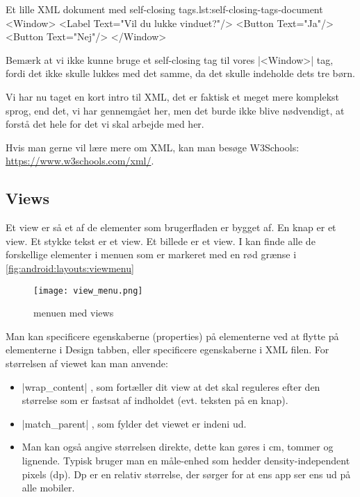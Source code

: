 \begin{example}
	\begin{XmlCode}{Et lille XML dokument med self-closing tags.}{lst:self-closing-tags-document}
		<Window>
			<Label Text="Vil du lukke vinduet?"/>
			<Button Text="Ja"/>
			<Button Text="Nej"/>
		</Window>
	\end{XmlCode}
\end{example}

\begin{remark}
	Bemærk at vi ikke kunne bruge et self-closing tag til vores \XmlInline|<Window>| tag, fordi det ikke skulle lukkes med det samme, da det skulle indeholde dets tre børn.
\end{remark}

Vi har nu taget en kort intro til XML, det er faktisk et meget mere komplekst sprog, end det, vi har gennemgået her, men det burde ikke blive nødvendigt, at forstå det hele for det vi skal arbejde med her.

Hvis man gerne vil lære mere om XML, kan man besøge W3Schools: \url{https://www.w3schools.com/xml/}.

\subsection{Views}
Et view er så et af de elementer som brugerfladen er bygget af. En knap er et view. Et stykke tekst er et view. Et billede er et view. I kan finde alle de forskellige elementer i menuen som er markeret med en rød grænse i \autoref{fig:android:layouts:viewmenu}

\begin{figure}[h]
		\texttt{[image: view\_menu.png]}
		\caption{menuen med views}
		\label{fig:android:layouts:viewmenu}
\end{figure}

Man kan specificere egenskaberne (properties) på elementerne ved at flytte på elementerne i Design tabben, eller specificere egenskaberne i XML filen. For størrelsen af viewet kan man anvende:
\begin{itemize}
	\item \XmlInline|wrap_content| , som fortæller dit view at det skal reguleres efter den størrelse som er fastsat af indholdet (evt. teksten på en knap).
	\item \XmlInline|match_parent| , som fylder det viewet er indeni ud.\\
	\item Man kan også angive størrelsen direkte, dette kan gøres i cm, tommer og lignende. Typisk bruger man en måle-enhed som hedder density-independent pixels (dp). Dp er en relativ størrelse, der sørger for at ens app ser ens ud på alle mobiler.
\end{itemize}

